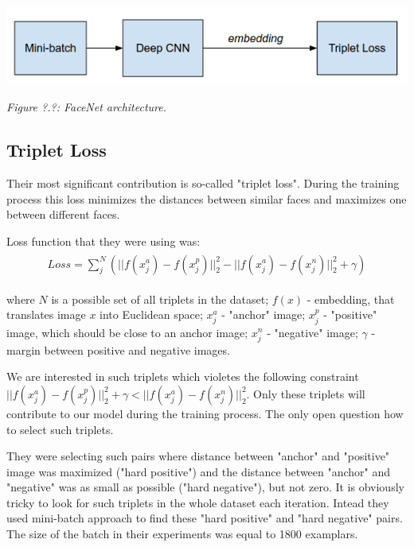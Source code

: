\documentclass[paper=a4, fontsize=11pt]{scrartcl} %
\numberwithin{equation}{section} %
\numberwithin{figure}{section} %
\numberwithin{table}{section} %
\begin{document}
\begin{center}
\includegraphics[scale=0.5]{pictures/arch_facenet.png}
\par\large\textit{Figure ?.?: FaceNet architecture.}
\end{center}

\subsection{Triplet Loss} 

Their most significant contribution is so-called "triplet loss". During the training process this loss minimizes the distances between similar faces and maximizes one between different faces.

Loss function that they were using was:
	\begin{align}
	\begin{split}
		 Loss = \sum_{j}^N \left( ||f(x_j^a)-f(x_j^p)||^2_2  - ||f(x_j^a)-f(x_j^n)||^2_2 + \gamma \right)
	\end{split}
	\end{align}
	
where $N$ is a possible set of all triplets in the dataset; $f(x)$ - embedding, that translates image $x$ into Euclidean space; $x_j^a$ - "anchor" image; $x_j^p$ - "positive" image, which should be close to an anchor image; $x_j^n$ - "negative" image; $\gamma$ - margin between positive and negative images.

We are interested in such triplets which violetes the following constraint $||f(x_j^a)-f(x_j^p)||^2_2 + \gamma < ||f(x_j^a)-f(x_j^n)||^2_2$. Only these triplets will contribute to our model during the training process. The only open question how to select such triplets.

They were selecting such pairs where distance between "anchor" and "positive" image was maximized ("hard positive") and the distance between "anchor" and "negative" was as small as possible ("hard negative"), but not zero. It is obviously tricky to look for such triplets in the whole dataset each iteration. Intead they used mini-batch approach to find these "hard positive" and "hard negative" pairs. The size of the batch in their experiments was equal to 1800 examplars.
\end{document}
